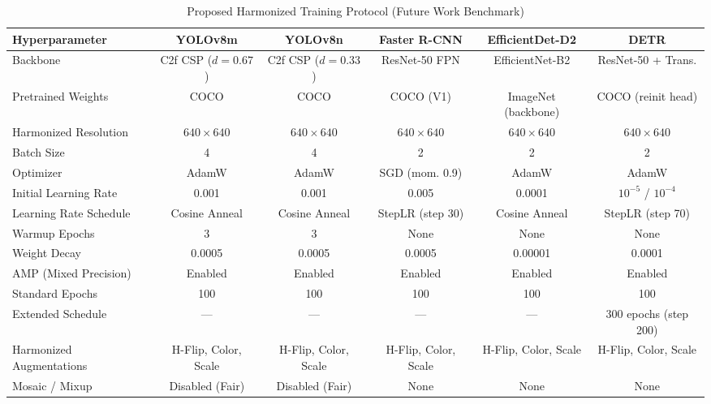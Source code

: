 
\begin{table}[htbp]
\centering
\caption{Proposed Harmonized Training Protocol (Future Work Benchmark)}
\label{tab:future_work_harmonized_protocol}
\small
\renewcommand{\arraystretch}{1.25}
\setlength{\tabcolsep}{5pt}
\begin{tabular}{lccccc}
\toprule
\textbf{Hyperparameter} & \textbf{YOLOv8m} & \textbf{YOLOv8n} & \textbf{Faster R-CNN} & \textbf{EfficientDet-D2} & \textbf{DETR} \\
\midrule
Backbone & C2f CSP ($d{=}0.67$) & C2f CSP ($d{=}0.33$) & ResNet-50 FPN & EfficientNet-B2 & ResNet-50 + Trans. \\
Pretrained Weights & COCO & COCO & COCO (V1) & ImageNet (backbone) & COCO (reinit head) \\
Harmonized Resolution & $640 \times 640$ & $640 \times 640$ & $640 \times 640$ & $640 \times 640$ & $640 \times 640$ \\
Batch Size & 4 & 4 & 2 & 2 & 2 \\
Optimizer & AdamW & AdamW & SGD (mom. 0.9) & AdamW & AdamW \\
Initial Learning Rate & 0.001 & 0.001 & 0.005 & 0.0001 & $10^{-5}$ / $10^{-4}$ \\
Learning Rate Schedule & Cosine Anneal & Cosine Anneal & StepLR (step 30) & Cosine Anneal & StepLR (step 70) \\
Warmup Epochs & 3 & 3 & None & None & None \\
Weight Decay & 0.0005 & 0.0005 & 0.0005 & 0.00001 & 0.0001 \\
AMP (Mixed Precision) & Enabled & Enabled & Enabled & Enabled & Enabled \\
Standard Epochs & 100 & 100 & 100 & 100 & 100 \\
Extended Schedule & --- & --- & --- & --- & 300 epochs (step 200) \\
Harmonized Augmentations & H-Flip, Color, Scale & H-Flip, Color, Scale & H-Flip, Color, Scale & H-Flip, Color, Scale & H-Flip, Color, Scale \\
Mosaic / Mixup & Disabled (Fair) & Disabled (Fair) & None & None & None \\
\bottomrule
\end{tabular}
\end{table}
